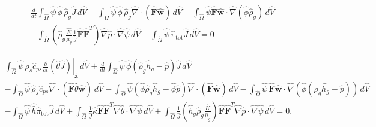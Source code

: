 \documentclass[11pt]{article}
\begin{document}
\begin{multline}
\frac{d}{dt} \int_{\widehat{\Omega}} \widehat{\psi}\,\widehat{\phi}\,\widehat{\rho}_g \widehat{J} \,d\widehat{V}
- \int_{\widehat{\Omega}} \widehat{\psi}\,\widehat{\phi}\,\widehat{\rho}_g
\widehat{\nabla}\cdot\left(\widehat{\mathbf{F}} \widehat{\mathbf{w}}\right) \,d\widehat{V}
- \int_{\widehat{\Omega}} \widehat{\psi} \widehat{\mathbf{F}} \widehat{\mathbf{w}}\cdot
\widehat{\nabla}\left(\widehat{\phi} \widehat{\rho}_g\right) \,d\widehat{V}
\\
+ \int_{\widehat{\Omega}} \left( \widehat{\rho}_g \frac{\widehat{K}}{\widehat{\mu}_g } \frac{1}{\widehat{J}} \widehat{\mathbf{F}} \widehat{\mathbf{F}}^{T} \right) \widehat{\nabla} \widehat{p} \cdot \widehat{\nabla}\widehat{\psi} \,d\widehat{V}
- \int_{\widehat{\Omega}} \widehat{\psi}\,\widehat{\pi}_{\mathrm{tot}} \widehat{J} \,d\widehat{V}
= 0
\end{multline}

\begin{multline}
\int_{\widehat{\Omega}}
\widehat{\psi}\,\widehat{\rho}_{s} \widehat{c}_{ps} \left. \frac{\partial}{\partial t} \left( \widehat{\theta} \widehat{J} \right)\right|_{\widehat{\mathbf{x}}} \,d\widehat{V}
+ \frac{d}{dt} \int_{\widehat{\Omega}}
\widehat{\psi}\,\widehat{\phi}(\widehat{\rho}_g \widehat{h}_g - \widehat{p}) \widehat{J}\,d\widehat{V}
\\
- \int_{\widehat{\Omega}}
\widehat{\psi}\,\widehat{\rho}_{s} \widehat{c}_{ps}
\widehat{\nabla} \cdot \left( \widehat{\mathbf{F}} \widehat{\theta} \widehat{\mathbf{w}} \right) \,d\widehat{V}
- \int_{\widehat{\Omega}} \widehat{\psi} \left( \widehat{\phi} \widehat{\rho}_g \widehat{h}_g - \widehat{\phi} \widehat{p} \right)
\widehat{\nabla} \cdot \left( \widehat{\mathbf{F}} \widehat{\mathbf{w}} \right) \,d\widehat{V}
- \int_{\widehat{\Omega}}
\widehat{\psi}\, \widehat{\mathbf{F}} \widehat{\mathbf{w}} \cdot
\widehat{\nabla}\left( \widehat{\phi}(\widehat{\rho}_g \widehat{h}_g - \widehat{p}) \right) \,d\widehat{V}
\\
- \int_{\widehat{\Omega}}
\widehat{\psi}\,\widehat{\bar{h}} \widehat{\pi}_{\mathrm{tot}}\widehat{J}\,d\widehat{V}
+ \int_{\widehat{\Omega}}
\frac{1}{\widehat{J}}
 \widehat{\kappa}
 \widehat{\mathbf{F}} \widehat{\mathbf{F}}^{T} \widehat{\nabla}\widehat{\theta}
\cdot\widehat{\nabla}\widehat{\psi} \,d\widehat{V}
+ \int_{\widehat{\Omega}}
\frac{1}{\widehat{J}}
\left(
\widehat{h}_g \widehat{\rho}_g
\frac{\widehat{K}}{\widehat{\mu}_g} \right) \widehat{\mathbf{F}} \widehat{\mathbf{F}}^{T} \widehat{\nabla} \widehat{p}
\cdot
\widehat{\nabla}\widehat{\psi}
\,d\widehat{V}
= 0.
\end{multline}
\end{document}
